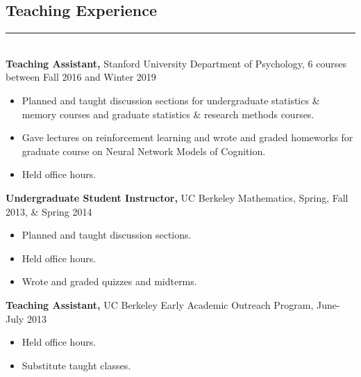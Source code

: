 \documentclass[margin]{res}
\begin{document}
\begin{resume}
{\vspace{1pt}\section{Teaching Experience} \vspace{-15pt} \rule{\textwidth}{0.5pt} \\[3pt]
{\bf Teaching Assistant,} Stanford University Department of Psychology, 6 courses between Fall 2016 and Winter 2019
\begin{itemize} \itemsep -2pt
  \item Planned and taught discussion sections for undergraduate statistics \& memory courses and graduate statistics \& research methods courses. \item Gave lectures on reinforcement learning and wrote and graded homeworks for graduate course on Neural Network Models of Cognition. \item Held office hours. \end{itemize}\vspace{-8pt}
{\bf Undergraduate Student Instructor,} UC Berkeley Mathematics, Spring, Fall 2013, \& Spring 2014 
\begin{itemize} \itemsep -2pt
  \item Planned and taught discussion sections. \item Held office hours. \item Wrote and graded quizzes and midterms. \end{itemize}\vspace{-8pt}
{\bf Teaching Assistant,} UC Berkeley Early Academic Outreach Program, June-July 2013
\begin{itemize} \itemsep -2pt
 \item Held office hours. \item Substitute taught classes. \end{itemize}

}
\end{resume}
\end{document}

